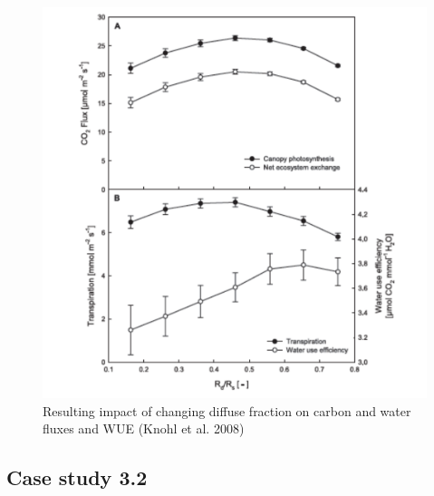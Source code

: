 \documentclass[12pt,oneside]{book}
\begin{document}
\begin{figure}

{\centering \includegraphics[width=0.8\linewidth]{figures/chap3/f333_knohl2} 

}

\caption{Resulting impact of changing diffuse fraction on carbon and water fluxes and WUE (Knohl et al. 2008)}\label{fig:f333}
\end{figure}

\subsection{Case study 3.2}\label{case-study-3.2}
\end{document}
